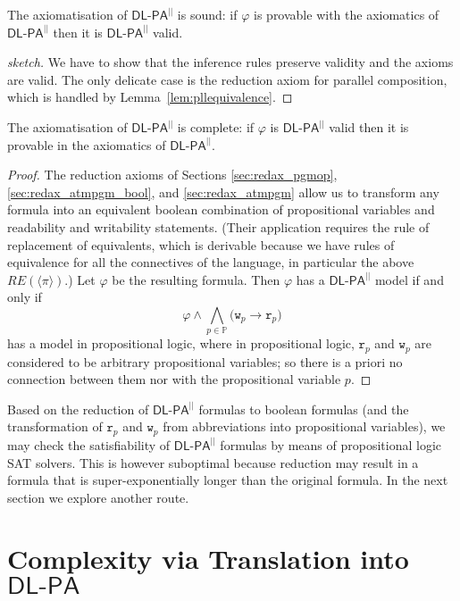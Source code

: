 \documentclass{llncs}
\newcommand{\pll}{ {||} }							%
\newcommand{\readable}[1]{\mathtt{r}_{#1}}
\newcommand{\writable}[1]{\mathtt{w}_{#1}}
\newcommand{\Dlpa}{\ensuremath{\mathsf{DL\text{-}PA}}\xspace}
\newcommand{\DlpaPll}{\ensuremath{\mathsf{DL\text{-}PA}^\pll}\xspace}
\newcommand{\assgnbotV}[1]{{\mathtt {-} #1}}
\newcommand{\ldia}[1]{ \big\langle #1 \big\rangle}
\newcommand{\leqv}{ \leftrightarrow }
\newcommand{\limp}{ \rightarrow }
\renewcommand{\phi}{\varphi}
\newcommand{\propset}{\mathbb P}
\begin{document}
\begin{theorem}
The axiomatisation of \DlpaPll is sound:
if $\phi$ is provable with the axiomatics of \DlpaPll then it is \DlpaPll valid.
\end{theorem}
\begin{proof}[sketch]
We have to show that the inference rules preserve validity and the axioms are valid. 
The only delicate case is the reduction axiom for parallel composition,
which is handled by Lemma~\ref{lem:pllequivalence}.
\end{proof}

\begin{theorem}
The axiomatisation of \DlpaPll is complete:
if $\phi$ is \DlpaPll valid then it is provable in the axiomatics of \DlpaPll. 
\end{theorem}
\begin{proof}
The reduction axioms of Sections \ref{sec:redax_pgmop}, \ref{sec:redax_atmpgm_bool}, and \ref{sec:redax_atmpgm} 
allow us to transform any formula into an equivalent boolean combination of 
propositional variables and readability and writability statements. 
(Their application requires the rule of replacement of equivalents, which is derivable 
because we have rules of equivalence for all the connectives of the language, 
in particular the above $RE(\ldia \pi)$.)
Let $\phi$ be the resulting formula. 
Then $\phi$ has a \DlpaPll model if and only if 
$$\phi \land 
\bigwedge_{p \in \propset} \big( \writable{p} \limp \readable p \big) $$
has a model in propositional logic, where in propositional logic,
$\readable p$ and $\writable{p}$ are considered to be arbitrary propositional variables; so
there is a priori no connection between them nor with the propositional variable $p$. 
\end{proof}


Based on the reduction of \DlpaPll formulas to boolean formulas 
(and the transformation of $\readable p$ and $\writable{p}$ from abbreviations into propositional variables),
we may check the satisfiability of \DlpaPll formulas by means of propositional logic SAT solvers. 
This is however suboptimal because reduction may result in a formula that is super-exponentially longer than the original formula. 
In the next section we explore another route.


\section{Complexity via Translation into \Dlpa}\label{sec:complexity}
\end{document}
